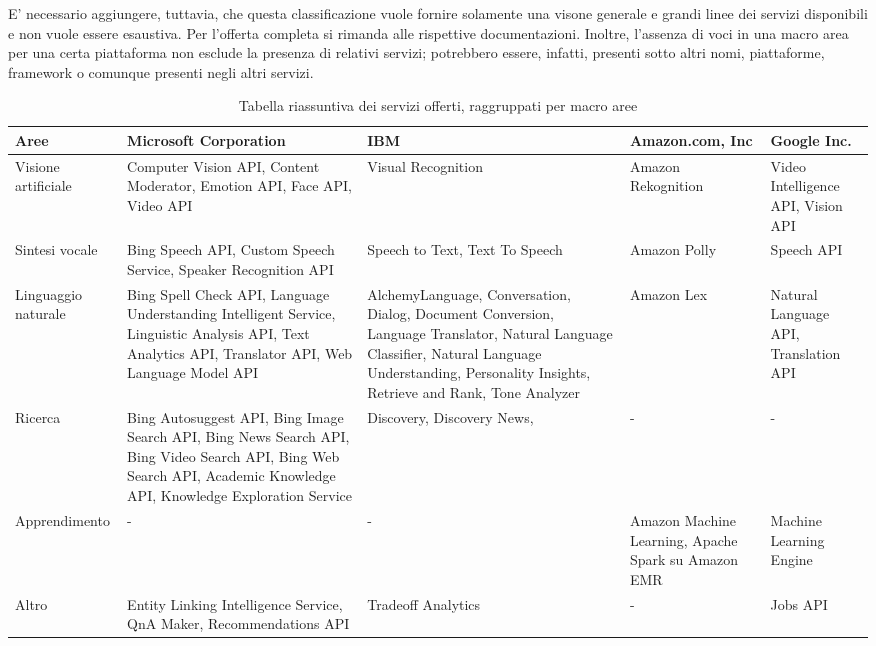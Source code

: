 E' necessario aggiungere, tuttavia, che questa classificazione vuole fornire solamente una visone generale e grandi linee dei servizi disponibili e non vuole essere esaustiva.
Per l'offerta completa si rimanda alle rispettive documentazioni. Inoltre, l'assenza di voci in una macro area per una certa piattaforma non esclude la presenza di relativi servizi; potrebbero essere, infatti, presenti sotto altri nomi, piattaforme, framework o comunque presenti negli altri servizi.
%
%
\begin{table}[!h]
\centering
{\scriptsize
\begin{tabularx}{.9\textwidth}{l|X|X|X|X}
\toprule
Aree & Microsoft Corporation & IBM & Amazon.com, Inc & Google Inc.\\ \hline
\midrule                           
\multicolumn{1}{l|}{Visione artificiale}
& Computer Vision API, Content Moderator, Emotion API, Face API, Video API
& Visual Recognition
& Amazon Rekognition
& Video Intelligence API, Vision API \\ \hline
\multicolumn{1}{l|}{Sintesi vocale}
& Bing Speech API, Custom Speech Service, Speaker Recognition API
& Speech to Text, Text To Speech
& Amazon Polly
& Speech API \\ \hline
\multicolumn{1}{l|}{Linguaggio naturale}
& Bing Spell Check API, Language Understanding Intelligent Service, Linguistic Analysis API, Text Analytics API, Translator API, Web Language Model API
& AlchemyLanguage, Conversation, Dialog, Document Conversion, Language Translator, Natural Language Classifier, Natural Language Understanding, Personality Insights, Retrieve and Rank, Tone Analyzer
& Amazon Lex
& Natural Language API, Translation API \\ \hline
\multicolumn{1}{l|}{Ricerca}
& Bing Autosuggest API, Bing Image Search API, Bing News Search API, Bing Video Search API, Bing Web Search API, Academic Knowledge API, Knowledge Exploration Service
& Discovery, Discovery News, 
& -
& - \\ \hline
\multicolumn{1}{l|}{Apprendimento}
& -
& -
& Amazon Machine Learning, Apache Spark su Amazon EMR
& Machine Learning Engine \\ \hline
\multicolumn{1}{l|}{Altro}
& Entity Linking Intelligence Service, QnA Maker, Recommendations API
& Tradeoff Analytics
& -
& Jobs API \\ \hline
\end{tabularx}}
\caption{Tabella riassuntiva dei servizi offerti, raggruppati per macro aree}
\label{tab-macro-aree}
\end{table}
%